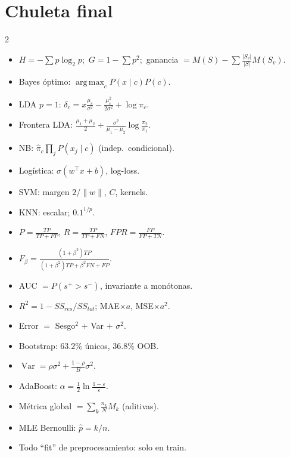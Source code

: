 \documentclass[10pt,a4paper]{article}
\DeclareMathOperator*{\argmax}{arg\,max}
\DeclareMathOperator{\Var}{Var}
\begin{document}
\section{Chuleta final}
\begin{multicols}{2}\small
\begin{itemize}
  \item $H=-\sum p\log_2p$;\ $G=1-\sum p^2$;\ ganancia $=M(S)-\sum\frac{|S_v|}{|S|}M(S_v)$.
  \item Bayes óptimo: $\argmax_c P(x\mid c)P(c)$.
  \item LDA $p=1$: $\delta_c=x\frac{\mu_c}{\sigma^2}-\frac{\mu_c^2}{2\sigma^2}+\log\pi_c$.
  \item Frontera LDA: $\frac{\mu_1+\mu_2}2+\frac{\sigma^2}{\mu_1-\mu_2}\log\frac{\pi_2}{\pi_1}$.
  \item NB: $\hat\pi_c\prod_j P(x_j\mid c)$ (indep.\ condicional).
  \item Logística: $\sigma(w^\top x+b)$, log-loss.
  \item SVM: margen $2/\|w\|$, $C$, kernels.
  \item KNN: escalar; $0.1^{1/p}$.
  \item $P=\frac{TP}{TP+FP}$, $R=\frac{TP}{TP+FN}$, $FPR=\frac{FP}{FP+TN}$.
  \item $F_\beta=\frac{(1+\beta^2)TP}{(1+\beta^2)TP+\beta^2FN+FP}$.
  \item AUC $=P(s^+>s^-)$, invariante a monótonas.
  \item $R^2=1-SS_{res}/SS_{tot}$; MAE$\times a$, MSE$\times a^2$.
  \item Error $=$ Sesgo$^2$ $+$ Var $+$ $\sigma^2$.
  \item Bootstrap: $63.2\%$ únicos, $36.8\%$ OOB.
  \item $\Var=\rho\sigma^2+\frac{1-\rho}B\sigma^2$.
  \item AdaBoost: $\alpha=\frac12\ln\frac{1-\varepsilon}\varepsilon$.
  \item Métrica global $=\sum_k\frac{n_k}{N}M_k$ (aditivas).
  \item MLE Bernoulli: $\hat p=k/n$.
  \item Todo ``fit'' de preprocesamiento: solo en train.
\end{itemize}
\end{multicols}
\end{document}
